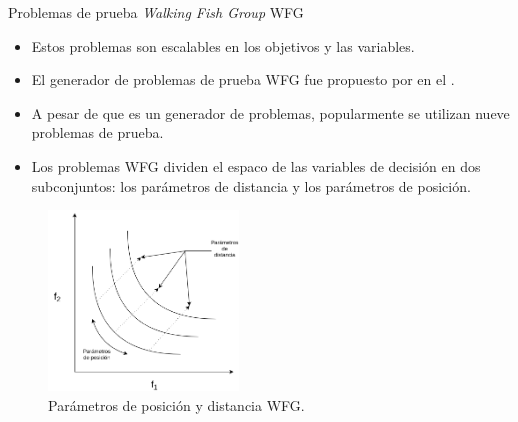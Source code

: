 \documentclass{beamer}
\begin{document}
\begin{frame}{Problemas de prueba \textit{Walking Fish Group} WFG}
\begin{itemize}
\scriptsize
   \item Estos problemas son escalables en los objetivos y las variables.
   \item El generador de problemas de prueba WFG fue propuesto por \citeauthor{Joel:WFG} en el \citeyear{Joel:WFG}.
   \item A pesar de que es un generador de problemas, popularmente se utilizan nueve problemas de prueba.
   \item Los problemas WFG dividen el espaco de las variables de decisión en dos subconjuntos: los parámetros de distancia y los parámetros de posición.
\end{itemize}
\begin{figure}[H]
\includegraphics[width=0.45\textwidth]{Images/pos_dist.png}
\centering
\caption{\scriptsize Parámetros de posición y distancia WFG.}
\end{figure}
\end{frame}
\end{document}
